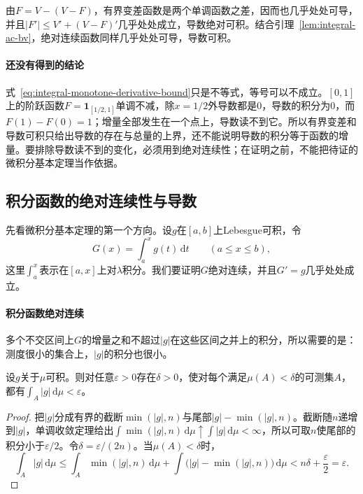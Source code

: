 由$F=V-(V-F)$，有界变差函数是两个单调函数之差，因而也几乎处处可导，并且$|F'|\le V'+(V-F)'$几乎处处成立，导数绝对可积。结合引理~\ref{lem:integral-ac-bv}，绝对连续函数同样几乎处处可导，导数可积。

\paragraph{还没有得到的结论}
式~\eqref{eq:integral-monotone-derivative-bound}只是不等式，等号可以不成立。$[0,1]$上的阶跃函数$F=\mathbf 1_{[1/2,1]}$单调不减，除$x=1/2$外导数都是$0$，导数的积分为$0$，而$F(1)-F(0)=1$；增量全部发生在一个点上，导数读不到它。所以有界变差和导数可积只给出导数的存在与总量的上界，还不能说明导数的积分等于函数的增量。要排除导数读不到的变化，必须用到绝对连续性；在证明之前，不能把待证的微积分基本定理当作依据。

\subsection{积分函数的绝对连续性与导数}
\label{sec:integral-indefinite}

先看微积分基本定理的第一个方向。设$g$在$[a,b]$上Lebesgue可积，令
\[
 G(x)=\int_a^xg(t)\,\mathrm dt\qquad(a\le x\le b),
\]
这里$\int_a^x$表示在$[a,x]$上对$\lambda$积分。我们要证明$G$绝对连续，并且$G'=g$几乎处处成立。

\paragraph{积分函数绝对连续}
多个不交区间上$G$的增量之和不超过$|g|$在这些区间之并上的积分，所以需要的是：测度很小的集合上，$|g|$的积分也很小。

\begin{lemma}[积分的绝对连续性]
\label{lem:integral-small-sets}
设$g$关于$\mu$可积。则对任意$\varepsilon>0$存在$\delta>0$，使对每个满足$\mu(A)<\delta$的可测集$A$，都有$\int_A|g|\,\mathrm d\mu<\varepsilon$。
\end{lemma}

\begin{proof}
把$|g|$分成有界的截断$\min(|g|,n)$与尾部$|g|-\min(|g|,n)$。截断随$n$递增到$|g|$，单调收敛定理给出$\int\min(|g|,n)\,\mathrm d\mu\uparrow\int|g|\,\mathrm d\mu<\infty$，所以可取$n$使尾部的积分小于$\varepsilon/2$。令$\delta=\varepsilon/(2n)$。当$\mu(A)<\delta$时，
\[
 \int_A|g|\,\mathrm d\mu\le\int_A\min(|g|,n)\,\mathrm d\mu+\int\bigl(|g|-\min(|g|,n)\bigr)\,\mathrm d\mu<n\delta+\frac\varepsilon2=\varepsilon.
\]
\end{proof}

